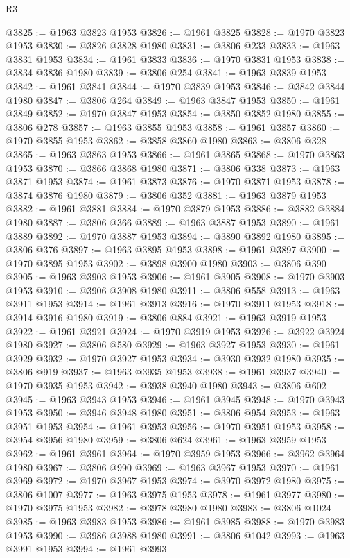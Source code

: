 \begin{lexlean}{R3}
\begin{coremodule}
@3825 := @1963 @3823 @1953
@3826 := @1961 @3825
@3828 := @1970 @3823 @1953
@3830 := @3826 @3828 @1980
@3831 := @3806 @233
@3833 := @1963 @3831 @1953
@3834 := @1961 @3833
@3836 := @1970 @3831 @1953
@3838 := @3834 @3836 @1980
@3839 := @3806 @254
@3841 := @1963 @3839 @1953
@3842 := @1961 @3841
@3844 := @1970 @3839 @1953
@3846 := @3842 @3844 @1980
@3847 := @3806 @264
@3849 := @1963 @3847 @1953
@3850 := @1961 @3849
@3852 := @1970 @3847 @1953
@3854 := @3850 @3852 @1980
@3855 := @3806 @278
@3857 := @1963 @3855 @1953
@3858 := @1961 @3857
@3860 := @1970 @3855 @1953
@3862 := @3858 @3860 @1980
@3863 := @3806 @328
@3865 := @1963 @3863 @1953
@3866 := @1961 @3865
@3868 := @1970 @3863 @1953
@3870 := @3866 @3868 @1980
@3871 := @3806 @338
@3873 := @1963 @3871 @1953
@3874 := @1961 @3873
@3876 := @1970 @3871 @1953
@3878 := @3874 @3876 @1980
@3879 := @3806 @352
@3881 := @1963 @3879 @1953
@3882 := @1961 @3881
@3884 := @1970 @3879 @1953
@3886 := @3882 @3884 @1980
@3887 := @3806 @366
@3889 := @1963 @3887 @1953
@3890 := @1961 @3889
@3892 := @1970 @3887 @1953
@3894 := @3890 @3892 @1980
@3895 := @3806 @376
@3897 := @1963 @3895 @1953
@3898 := @1961 @3897
@3900 := @1970 @3895 @1953
@3902 := @3898 @3900 @1980
@3903 := @3806 @390
@3905 := @1963 @3903 @1953
@3906 := @1961 @3905
@3908 := @1970 @3903 @1953
@3910 := @3906 @3908 @1980
@3911 := @3806 @558
@3913 := @1963 @3911 @1953
@3914 := @1961 @3913
@3916 := @1970 @3911 @1953
@3918 := @3914 @3916 @1980
@3919 := @3806 @884
@3921 := @1963 @3919 @1953
@3922 := @1961 @3921
@3924 := @1970 @3919 @1953
@3926 := @3922 @3924 @1980
@3927 := @3806 @580
@3929 := @1963 @3927 @1953
@3930 := @1961 @3929
@3932 := @1970 @3927 @1953
@3934 := @3930 @3932 @1980
@3935 := @3806 @919
@3937 := @1963 @3935 @1953
@3938 := @1961 @3937
@3940 := @1970 @3935 @1953
@3942 := @3938 @3940 @1980
@3943 := @3806 @602
@3945 := @1963 @3943 @1953
@3946 := @1961 @3945
@3948 := @1970 @3943 @1953
@3950 := @3946 @3948 @1980
@3951 := @3806 @954
@3953 := @1963 @3951 @1953
@3954 := @1961 @3953
@3956 := @1970 @3951 @1953
@3958 := @3954 @3956 @1980
@3959 := @3806 @624
@3961 := @1963 @3959 @1953
@3962 := @1961 @3961
@3964 := @1970 @3959 @1953
@3966 := @3962 @3964 @1980
@3967 := @3806 @990
@3969 := @1963 @3967 @1953
@3970 := @1961 @3969
@3972 := @1970 @3967 @1953
@3974 := @3970 @3972 @1980
@3975 := @3806 @1007
@3977 := @1963 @3975 @1953
@3978 := @1961 @3977
@3980 := @1970 @3975 @1953
@3982 := @3978 @3980 @1980
@3983 := @3806 @1024
@3985 := @1963 @3983 @1953
@3986 := @1961 @3985
@3988 := @1970 @3983 @1953
@3990 := @3986 @3988 @1980
@3991 := @3806 @1042
@3993 := @1963 @3991 @1953
@3994 := @1961 @3993

\end{coremodule}
\end{lexlean}
